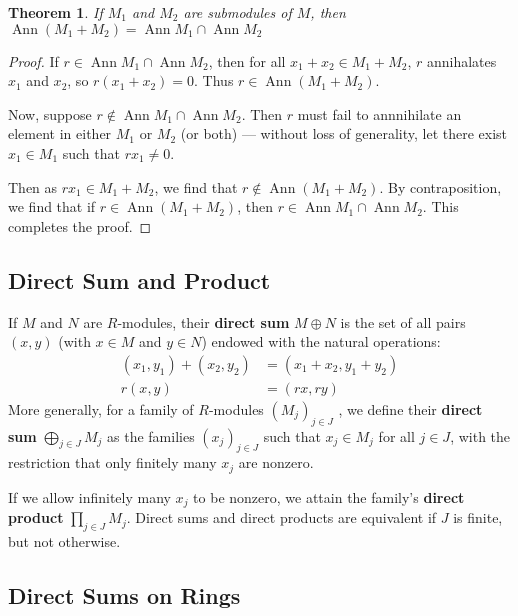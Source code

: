 \documentclass[11pt]{article}
\newtheorem{theorem}{Theorem}
\newcommand{\Ann}{\operatorname{Ann}}
\begin{document}
\begin{adjustwidth}{0.5cm}{}
	\begin{theorem}
		If $M_{1}$ and $M_{2}$ are submodules of $M$, then $\Ann(M_{1} + M_{2}) = \Ann M_{1} \cap \Ann M_{2}$
	\end{theorem}
	\begin{proof}
		If $r \in \Ann M_{1} \cap \Ann M_{2} $, then for all $x_{1} + x_{2} \in M_{1} + M_{2}$, $r$ annihalates $x_{1}$ and $x_{2}$, so $r(x_{1} + x_{2}) = 0.$ Thus $r \in \Ann(M_{1} + M_{2})$.

		Now, suppose $r \notin \Ann M_{1} \cap \Ann M_{2} $. Then $r$ must fail to annnihilate an element in either $M_{1}$ or $M_{2}$ (or both) --- without loss of generality, let there exist $x_{1} \in M_{1}$ such that $rx_{1} \ne 0$.

		Then as $rx_{1} \in M_{1} + M_{2}$, we find that $r \notin \Ann(M_{1} + M_{2})$. By contraposition, we find that if $r \in \Ann(M_{1} + M_{2})$, then $r \in \Ann M_{1} \cap \Ann M_{2}$. This completes the proof.
	\end{proof}
\end{adjustwidth}


\subsection{Direct Sum and Product}

If $M$ and $N$ are $R$-modules, their \textbf{direct sum} $M \oplus N$ is the set of all pairs $(x, y)$ (with $x \in M$ and $y \in N$) endowed with the natural operations:
\begin{align*}
	(x_{1}, y_{1}) + (x_{2}, y_{2}) & = (x_{1} + x_{2}, y_{1} + y_{2}) \\
	r(x, y)                         & = (rx, ry)
\end{align*}
More generally, for a family of $R$-modules $(M_{j})_{j \in J}$ , we define their \textbf{direct sum} $\bigoplus_{j \in J} M_{j}$ as the families $(x_{j})_{j \in J}$ such that $x_{j} \in M_{j}$ for all $j \in J$, with the restriction that only finitely many $x_{j}$ are nonzero.

If we allow infinitely many $x_{j}$ to be nonzero, we attain the family's \textbf{direct product} $\prod_{j \in J} M_{j}$. Direct sums and direct products are equivalent if $J$ is finite, but not otherwise.

\newpage

\subsection{Direct Sums on Rings}
\end{document}
